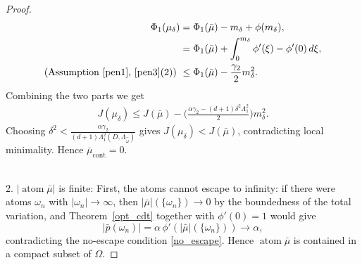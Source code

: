\documentclass[11pt]{amsart}
\theoremstyle{definition}
\theoremstyle{remark}
\DeclareMathOperator{\atom}{atom}
\DeclareMathOperator{\cont}{cont}
\begin{document}
\begin{proof}
\begin{align*}
	\Phi_1(\mu_\delta) &= \Phi_1(\bar{\mu}) - m_\delta + \phi(m_\delta),\\
	&= \Phi_1(\bar{\mu}) + \int_0^{m_\delta} \phi'(\xi) - \phi'(0) \, d\xi,\\
	\text{(Assumption~\ref{pen1}, \ref{pen3}(2)) }
	& \le \Phi_1(\bar{\mu}) - \frac{ \gamma_2 }{2} m_\delta^2.
\end{align*}
Combining the two parts we get
\begin{align*}
	J(\mu_\delta) \le J(\bar{\mu}) - \bigg(\frac{ \alpha \gamma_2 - (d + 1) \delta^2 \Lambda_1^2}{2} \bigg) m_\delta^2.
\end{align*}
Choosing $\delta^2 < \frac{\alpha \gamma_2}{(d + 1)\Lambda_1^2(D, \Lambda_{\hat{\omega}})}$
gives $J(\mu_\delta) < J(\bar{\mu})$, contradicting local minimality. Hence
$\bar{\mu}_{\cont} = 0$.
 
\quad\\
2. $|\atom \bar{\mu}|$ is finite:
First, the atoms cannot escape to infinity: if there were atoms $\omega_n$ with
$|\omega_n| \rightarrow \infty$, then $|\bar{\mu}|(\{\omega_n\}) \rightarrow 0$
by the boundedness of the total variation, and Theorem~\ref{opt_cdt} together
with $\phi'(0) = 1$ would give
\begin{equation*}
	|\bar{p}(\omega_n)|
	= \alpha \, \phi'(|\bar{\mu}|(\{\omega_n\}))
	\rightarrow \alpha,
\end{equation*}
contradicting the no-escape condition \eqref{no_escape}. Hence
$\atom \bar{\mu}$ is contained in a compact subset of $\Omega$.


\end{proof}
\end{document}

